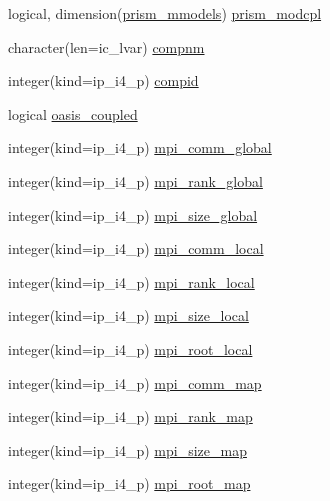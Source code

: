 \begin{DoxyCompactItemize}
\item 
logical, dimension(\hyperlink{namespacemod__oasis__data_a11c61975c048981f7e508f1b6caf16b6}{prism\+\_\+mmodels}) \hyperlink{namespacemod__oasis__data_ad5282716e60cbe5e8c1ced7758fc9ae1}{prism\+\_\+modcpl}
\item 
character(len=ic\+\_\+lvar) \hyperlink{namespacemod__oasis__data_a8379835615758ccf7a4287dde5785681}{compnm}
\item 
integer(kind=ip\+\_\+i4\+\_\+p) \hyperlink{namespacemod__oasis__data_ab53c9f7676f84fdf1050cea5efcd3e7f}{compid}
\item 
logical \hyperlink{namespacemod__oasis__data_a5056590b195dc981725173c79e52de3b}{oasis\+\_\+coupled}
\item 
integer(kind=ip\+\_\+i4\+\_\+p) \hyperlink{namespacemod__oasis__data_a4bbff51054fd1746849de9defb3d5252}{mpi\+\_\+comm\+\_\+global}
\item 
integer(kind=ip\+\_\+i4\+\_\+p) \hyperlink{namespacemod__oasis__data_af9bb2a4f321e7d7750e90c01022828fe}{mpi\+\_\+rank\+\_\+global}
\item 
integer(kind=ip\+\_\+i4\+\_\+p) \hyperlink{namespacemod__oasis__data_a83a9d498c6829e2058675a07446ce5be}{mpi\+\_\+size\+\_\+global}
\item 
integer(kind=ip\+\_\+i4\+\_\+p) \hyperlink{namespacemod__oasis__data_acd8801d4fab87a19c6f4f69a661d56c5}{mpi\+\_\+comm\+\_\+local}
\item 
integer(kind=ip\+\_\+i4\+\_\+p) \hyperlink{namespacemod__oasis__data_a811747a1592795f860854f09f19d4c25}{mpi\+\_\+rank\+\_\+local}
\item 
integer(kind=ip\+\_\+i4\+\_\+p) \hyperlink{namespacemod__oasis__data_a617f69fb4d4bb96a94f83a124b4d0030}{mpi\+\_\+size\+\_\+local}
\item 
integer(kind=ip\+\_\+i4\+\_\+p) \hyperlink{namespacemod__oasis__data_a2c468f26bc0c9b2ad5d54d68733e7047}{mpi\+\_\+root\+\_\+local}
\item 
integer(kind=ip\+\_\+i4\+\_\+p) \hyperlink{namespacemod__oasis__data_a8ff971286c1f235b8a328b3298f58a9b}{mpi\+\_\+comm\+\_\+map}
\item 
integer(kind=ip\+\_\+i4\+\_\+p) \hyperlink{namespacemod__oasis__data_a5e29025a6d83c7a01f88febbb734b7e9}{mpi\+\_\+rank\+\_\+map}
\item 
integer(kind=ip\+\_\+i4\+\_\+p) \hyperlink{namespacemod__oasis__data_ac4a6f10dab1d3078f8467465c21b9fdd}{mpi\+\_\+size\+\_\+map}
\item 
integer(kind=ip\+\_\+i4\+\_\+p) \hyperlink{namespacemod__oasis__data_a177c2b47ae4c69407d55817cd468b0ae}{mpi\+\_\+root\+\_\+map}

\end{DoxyCompactItemize}
